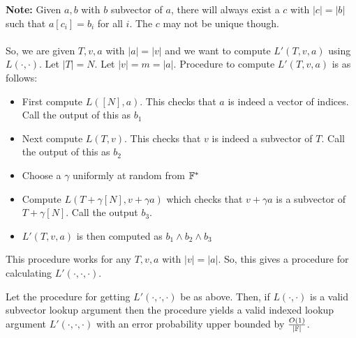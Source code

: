 \textbf{Note:} Given $a,b$ with $b$ subvector of $a$, there will always exist a $c$ with $|c|=|b|$ such that $a[c_i]=b_i$ for all $i$. The $c$ may not be unique though. \\\\
So, we are given $T, v, a$ with $|a|=|v|$ and we want to compute $L'(T, v, a)$ using $L(\cdot, \cdot)$.
Let $|T|=N$. Let $|v|=m=|a|$.
Procedure to compute $L'(T, v, a)$ is as follows:
\begin{itemize}
    \item First compute $L([N], a)$. This checks that $a$ is indeed a vector of indices. Call the output of this as $b_1$
    \item Next compute $L(T, v)$. This checks that $v$ is indeed a subvector of $T$. Call the output of this as $b_2$
    \item Choose a $\gamma$ uniformly at random from $\mathbb{F}^*$
    \item Compute $L(T+\gamma[N], v+\gamma a)$ which checks that $v+\gamma a$ is a subvector of $T+\gamma [N]$. Call the output $b_3$.
    \item $L'(T, v, a)$ is then computed as $b_1 \wedge b_2 \wedge b_3$
\end{itemize}
This procedure works for any $T,v,a$ with $|v|=|a|$. So, this gives a procedure for calculating $L'(\cdot, \cdot, \cdot)$.

\begin{lemma}\label{lem:reduction}
Let the procedure for getting $L'(\cdot, \cdot, \cdot)$ be as above. Then, if $L(\cdot, \cdot)$ is a valid subvector lookup argument then the procedure yields a valid indexed lookup argument $L'(\cdot, \cdot, \cdot)$ with an error probability upper bounded by $\frac{O(1)}{|\mathbb{F}|}$.
\end{lemma}

